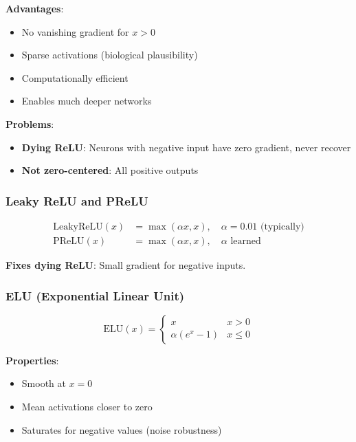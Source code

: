 \textbf{Advantages}:
\begin{itemize}
    \item No vanishing gradient for $x > 0$
    \item Sparse activations (biological plausibility)
    \item Computationally efficient
    \item Enables much deeper networks
\end{itemize}

\textbf{Problems}:
\begin{itemize}
    \item \textbf{Dying ReLU}: Neurons with negative input have zero gradient, never recover
    \item \textbf{Not zero-centered}: All positive outputs
\end{itemize}

\subsubsection{Leaky ReLU and PReLU}

\begin{align}
\text{LeakyReLU}(x) &= \max(\alpha x, x), \quad \alpha = 0.01 \text{ (typically)} \\
\text{PReLU}(x) &= \max(\alpha x, x), \quad \alpha \text{ learned}
\end{align}

\textbf{Fixes dying ReLU}: Small gradient for negative inputs.

\subsubsection{ELU (Exponential Linear Unit)}

\begin{equation}
\text{ELU}(x) = \begin{cases} x & x > 0 \\ \alpha(e^x - 1) & x \leq 0 \end{cases}
\end{equation}

\textbf{Properties}:
\begin{itemize}
    \item Smooth at $x = 0$
    \item Mean activations closer to zero
    \item Saturates for negative values (noise robustness)
\end{itemize}

